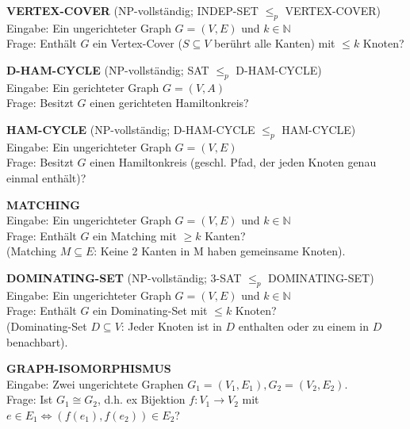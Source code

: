 \documentclass[a4paper,graphics,11pt]{article}
\begin{document}
\strut

\textbf{VERTEX-COVER} (\textsf{NP}-vollständig; INDEP-SET $\leq_p$ VERTEX-COVER)
\\[5pt]
Eingabe: Ein ungerichteter Graph $G = (V,E)$ und $k \in \mathbb{N}$
\\[5pt]
Frage: Enthält $G$ ein Vertex-Cover ($S \subseteq V$ berührt alle Kanten) mit $\leq k$ Knoten?

\strut

\textbf{D-HAM-CYCLE} (\textsf{NP}-vollständig; SAT $\leq_p$ D-HAM-CYCLE)
\\[5pt]
Eingabe: Ein gerichteter Graph $G = (V,A)$
\\[5pt]
Frage: Besitzt $G$ einen gerichteten Hamiltonkreis?

\strut

\textbf{HAM-CYCLE} (\textsf{NP}-vollständig; D-HAM-CYCLE $\leq_p$ HAM-CYCLE)
\\[5pt]
Eingabe: Ein ungerichteter Graph $G = (V,E)$
\\[5pt]
Frage: Besitzt $G$ einen Hamiltonkreis (geschl. Pfad, der jeden Knoten genau einmal enthält)?

\strut

\textbf{MATCHING}
\\[5pt]
Eingabe: Ein ungerichteter Graph $G = (V,E)$ und $k \in \mathbb{N}$
\\[5pt]
Frage: Enthält $G$ ein Matching mit $\geq k$ Kanten?\\
(Matching $M \subseteq E$: Keine 2 Kanten in M haben gemeinsame Knoten).

\strut

\textbf{DOMINATING-SET} (\textsf{NP}-vollständig; 3-SAT $\leq_p$ DOMINATING-SET)
\\[5pt]
Eingabe: Ein ungerichteter Graph $G = (V,E)$ und $k \in \mathbb{N}$
\\[5pt]
Frage: Enthält $G$ ein Dominating-Set mit $\leq k$ Knoten?\\[5pt]
(Dominating-Set $D \subseteq V$: Jeder Knoten ist in $D$ enthalten oder zu einem in $D$ benachbart).

\strut

\textbf{GRAPH-ISOMORPHISMUS}
\\[5pt]
Eingabe: Zwei ungerichtete Graphen $G_1= (V_1,E_1), G_2=(V_2,E_2)$.
\\[5pt]
Frage: Ist $G_1 \cong G_2$, d.h. ex Bijektion $f:V_1 \to V_2$ mit $e \in E_1 \iff (f(e_1),f(e_2)) \in E_2$?

\strut
\end{document}

